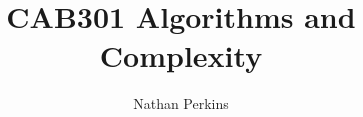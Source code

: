 \documentclass[]{report}
\title{CAB301 Algorithms and Complexity}
\author{Nathan Perkins}
\begin{document}
\maketitle

\begin{abstract}
\end{abstract}
\end{document}
